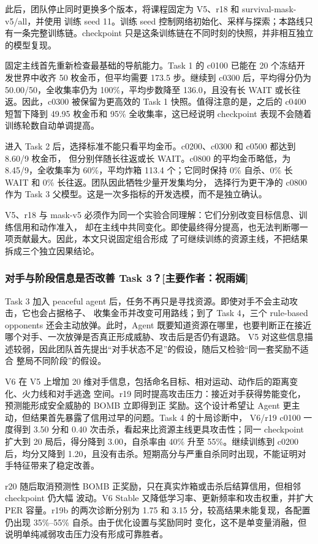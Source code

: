 \documentclass[UTF8,11pt,a4paper,fontset=none]{ctexart}
\newcommand{\primaryauthor}[1]{\texorpdfstring{\enspace\normalfont\small[主要作者：#1]}{ [主要作者：#1]}}
\newcommand{\authorsubsubsection}[2]{\subsubsection{#1\primaryauthor{#2}}}
\begin{document}
此后，团队停止同时更换多个版本，将课程固定为 V5、r18 和 survival-mask-v5/all，并使用
训练 seed 11。训练 seed 控制网络初始化、采样与探索；本路线只有一条完整训练链。checkpoint
只是这条训练链在不同时刻的快照，并非相互独立的模型复现。

固定主线首先重新检查最基础的导航能力。Task 1 的 c0100 已能在 20 个冻结开发世界中收齐
50 枚金币，但平均需要 173.5 步。继续到 c0300 后，平均得分仍为 50.00/50，全收集率仍为
100\%，平均步数降至 136.0，且没有长 WAIT 或长往返。因此，c0300 被保留为更高效的 Task 1
快照。值得注意的是，之后的 c0400 短暂下降到 49.95 枚金币和 95\% 全收集率，这已经说明
checkpoint 表现不会随着训练轮数自动单调提高。

进入 Task 2 后，选择标准不能只看平均金币。c0200、c0300 和 c0500 都达到 8.60/9 枚金币，
但分别伴随长往返或长 WAIT。c0800 的平均金币略低，为 8.45/9，全收集率为 60\%，平均炸箱
113.4 个；它同时保持 0\% 自杀、0\% 长 WAIT 和 0\% 长往返。团队因此牺牲少量开发集均分，
选择行为更干净的 c0800 作为 Task 3 父模型。这是一次多指标的开发选模，而不是独立确认。

V5、r18 与 mask-v5 必须作为同一个实验合同理解：它们分别改变目标信息、训练信用和动作准入，
却在主线中共同变化。即使最终得分提高，也无法判断哪一项贡献最大。因此，本文只说固定组合形成
了可继续训练的资源主线，不把结果拆成三个独立因果结论。

\authorsubsubsection{对手与阶段信息是否改善 Task 3？}{祝雨嫣}

Task 3 加入 peaceful agent 后，任务不再只是寻找资源。即使对手不会主动攻击，它也会占据格子、
收集金币并改变可用路线；到了 Task 4，三个 rule-based opponents 还会主动放弹。此时，Agent
既要知道资源在哪里，也要判断正在接近哪个对手、一次放弹是否真正形成威胁、攻击后是否仍有退路。
V5 对这些信息描述较弱，因此团队首先提出“对手状态不足”的假设，随后又检验“同一套奖励不适合
整局不同阶段”的假设。

V6 在 V5 上增加 20 维对手信息，包括命名目标、相对运动、动作后的距离变化、火力线和对手逃逸
空间。r19 同时提高攻击压力：接近对手获得势能变化，预测能形成安全威胁的 BOMB 立即得到正
奖励。这个设计希望让 Agent 更主动，但结果首先暴露了信用过早的问题。Task 4 的十局诊断中，
V6/r19 c0100 一度得到 3.50 分和 0.40 次击杀，看起来比资源主线更具攻击性；同一 checkpoint
扩大到 20 局后，得分降到 3.00，自杀率由 40\% 升至 55\%。继续训练到 c0200 后，均分又降到
1.20，且没有击杀。短期高分与严重自杀同时出现，不能证明对手特征带来了稳定改善。

r20 随后取消预测性 BOMB 正奖励，只在真实炸箱或击杀后结算信用，但相邻 checkpoint 仍大幅
波动。V6 Stable 又降低学习率、更新频率和攻击权重，并扩大 PER 容量。r19b 的两次诊断分别为
1.75 和 3.15 分，较高结果未能复现，各配置仍出现 35\%--55\% 自杀。由于优化设置与奖励同时
变化，这不是单变量消融，但说明单纯减弱攻击压力没有形成可靠胜者。
\end{document}
